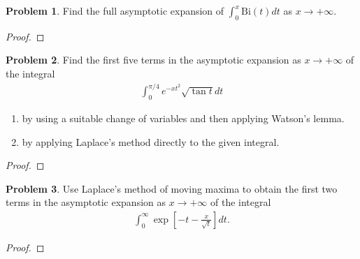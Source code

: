 \documentclass[12pt]{article}
\theoremstyle{definition}
\newtheorem{problem}{Problem}
\begin{document}
\begin{problem}
  Find the full asymptotic expansion of $\int_0^x \text{Bi}(t) dt$ as $x \to +\infty$.
\end{problem}

\begin{proof}
\end{proof}
\newpage


\begin{problem}
  Find the first five terms in the asymptotic expansion as $x \to +\infty$ of the integral
  \begin{align*}
    \int_0^{\pi/4} e^{-xt^2}\sqrt{\tan t}   dt
  \end{align*}
  \begin{enumerate}
    \item by using a suitable change of variables and then applying Watson's lemma.
    \item by applying Laplace's method directly to the given integral.
  \end{enumerate}
\end{problem}

\begin{proof}
\end{proof}
\newpage


\begin{problem}
  Use Laplace's method of moving maxima to obtain the first two terms in the asymptotic
  expansion as $x \to +\infty$ of the integral
  \begin{align}\label{exp_int}
    \int_{0}^\infty \exp\left[-t - \frac{x}{\sqrt{t}}\right] dt.
  \end{align}
\end{problem}

\begin{proof}
\end{proof}
\newpage
\end{document}
